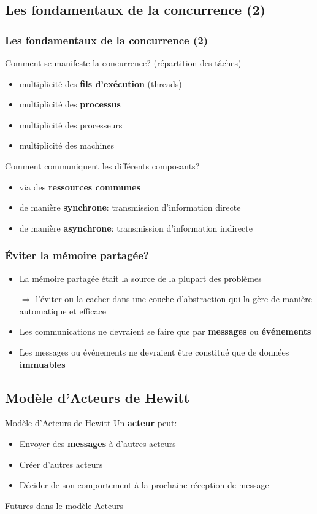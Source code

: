 \documentclass{beamer}
\begin{document}
\subsection{Les fondamentaux de la concurrence (2)}
\begin{frame}
  \frametitle{Les fondamentaux de la concurrence (2)}
  Comment se manifeste la concurrence? (répartition des tâches)
  \begin{itemize}
  \item multiplicité des \textbf{fils d'exécution} (threads)
  \item multiplicité des \textbf{processus}
  \item<2-> multiplicité des processeurs
  \item<2-> multiplicité des machines
  \end{itemize}

  Comment communiquent les différents composants?
  \begin{itemize}
  \item via des \textbf{ressources communes}
  \item<3-> de manière \textbf{synchrone}: transmission d'information directe
  \item<3-> de manière \textbf{asynchrone}: transmission d'information indirecte
  \end{itemize}
\end{frame} %
\begin{frame}
  \frametitle{Éviter la mémoire partagée?}
  \begin{itemize}
  \item La mémoire partagée était la source de la plupart des problèmes
    \par\bigskip
    $\Rightarrow$ l'éviter ou la cacher dans une couche d'abstraction qui la
    gère de manière automatique et efficace
  \item<2-> Les communications ne devraient se faire que par \textbf{messages} ou \textbf{événements}
  \item<3-> Les messages ou événements ne devraient être constitué que de données \textbf{immuables}
  \end{itemize}
\end{frame}
\subsection{Modèle d'Acteurs de Hewitt}
\begin{frame}{Modèle d'Acteurs de Hewitt}
  Un \textbf{acteur} peut:
  \begin{itemize}
  \item Envoyer des \textbf{messages} à d'autres acteurs
  \item Créer d'autres acteurs
  \item Décider de son comportement à la prochaine réception de message
  \end{itemize}
\end{frame} %
\begin{frame}{Futures dans le modèle Acteurs}
\end{frame} %
\end{document}
